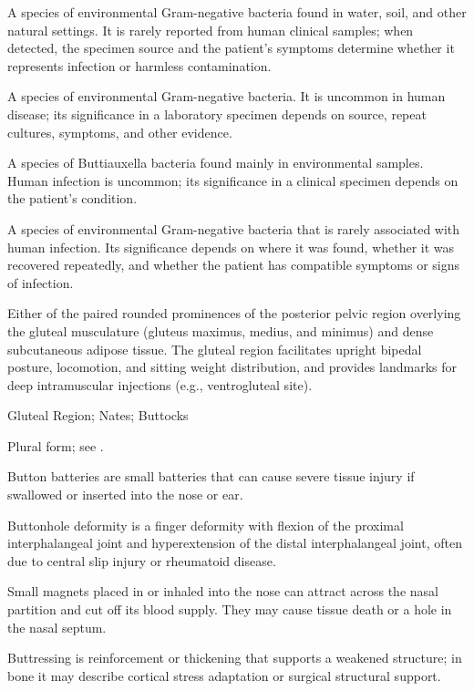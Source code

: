  A species of environmental Gram-negative bacteria found in water, soil, and other natural settings. It is rarely reported from human clinical samples; when detected, the specimen source and the patient’s symptoms determine whether it represents infection or harmless contamination.

 A species of environmental Gram-negative bacteria. It is uncommon in human disease; its significance in a laboratory specimen depends on source, repeat cultures, symptoms, and other evidence.

 A species of Buttiauxella bacteria found mainly in environmental samples. Human infection is uncommon; its significance in a clinical specimen depends on the patient's condition.

 A species of environmental Gram-negative bacteria that is rarely associated with human infection. Its significance depends on where it was found, whether it was recovered repeatedly, and whether the patient has compatible symptoms or signs of infection.

 Either of the paired rounded prominences of the posterior pelvic region overlying the gluteal musculature (gluteus maximus, medius, and minimus) and dense subcutaneous adipose tissue. The gluteal region facilitates upright bipedal posture, locomotion, and sitting weight distribution, and provides landmarks for deep intramuscular injections (e.g., ventrogluteal site).

\synonyms
Gluteal Region; Nates; Buttocks

 Plural form; see .

 Button batteries are small batteries that can cause severe tissue injury if swallowed or inserted into the nose or ear.

 Buttonhole deformity is a finger deformity with flexion of the proximal interphalangeal joint and hyperextension of the distal interphalangeal joint, often due to central slip injury or rheumatoid disease.

 Small magnets placed in or inhaled into the nose can attract across the nasal partition and cut off its blood supply. They may cause tissue death or a hole in the nasal septum.

 Buttressing is reinforcement or thickening that supports a weakened structure; in bone it may describe cortical stress adaptation or surgical structural support.

